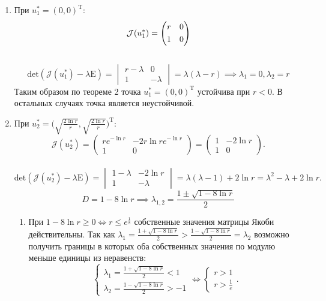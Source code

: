 \documentclass[10pt]{article}
\numberwithin{equation}{section}
\begin{document}
\begin{enumerate}
	\item При \( u_1^* = (0,0)^\mathrm{T} \):
	\[\mathcal{J}(u_1^*) = \begin{pmatrix} r & 0 \smallskip\\ 1 & 0 \end{pmatrix} \] \\
	\[ \mathrm{det} ( \mathcal{J}(u_1^*) - \lambda \mathrm{E}) = \begin{vmatrix} r - \lambda & 0 \\ 1 & -\lambda \end{vmatrix} = \lambda(\lambda - r)  \implies \lambda_1 = 0, \lambda_2 = r\]
	Таким образом по теореме 2 точка \( u_1^* = (0, 0)^{\mathrm{T}} \) устойчива при \( r < 0 \). В остальных случаях точка является неустойчивой.
	\item При \( u_2^* = \bigg(\sqrt{\frac{2\ln r}{r}}, \sqrt{\frac{2\ln r}{r}}\bigg)^\mathrm{T} \):
	\[ \mathcal{J}(u_2^*) = \begin{pmatrix} re^{-\ln r} & -2r\ln r e^{-\ln r} \\ 1 & 0 \end{pmatrix}  = \begin{pmatrix} 1 & -2\ln r \\ 1 & 0 \end{pmatrix}. \]\\
	\[ \mathrm{det} (\mathcal{J} (u_2^*) - \lambda \mathrm{E} ) = \begin{vmatrix} 1 - \lambda & -2\ln r \\ 1 & -\lambda \end{vmatrix} = \lambda (\lambda - 1) + 2 \ln r = \lambda^2 - \lambda + 2 \ln r. \]
	\[ D = 1 - 8 \ln r \implies \lambda_{1,2} = \frac{1 \pm \sqrt{1 - 8 \ln r}}{2}\]
	\begin{enumerate}
		\item При \( 1 - 8 \ln r \ge 0 \iff r \le e^\frac{1}{8}\) собственные значения матрицы Якоби действительны.
		Так как \( \lambda_1 = \frac{1 + \sqrt{1 - 8 \ln r}}{2} > \frac{1 - \sqrt{1 - 8 \ln r}}{2} = \lambda_2 \) возможно получить границы в которых оба собственных значения по модулю меньше единицы из неравенств:
		\[ \begin{cases} \lambda_1 = \frac{1 + \sqrt{1 - 8 \ln r}}{2} < 1 \\ \lambda_2 = \frac{1 - \sqrt{1 - 8 \ln r}}{2} > -1 \end{cases} \iff \begin{cases} r > 1 \\ r > \frac{1}{e} \end{cases}. \]

\end{enumerate}
\end{enumerate}
\end{document}
